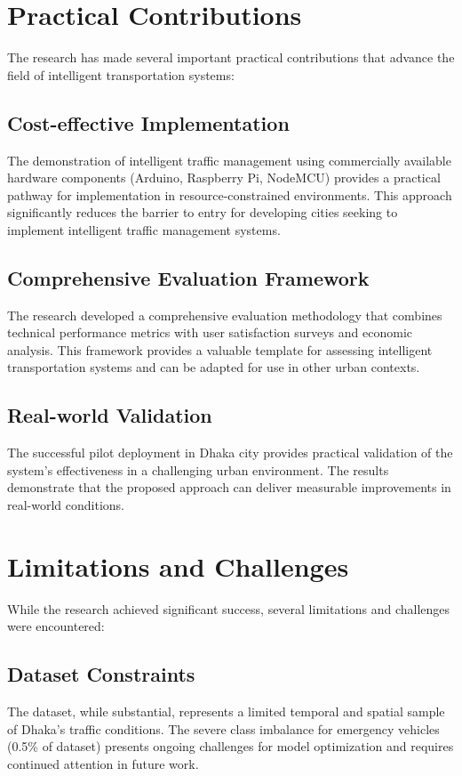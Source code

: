 \section{Practical Contributions}
\label{sec:practical_contributions}

The research has made several important practical contributions that advance the field of intelligent transportation systems:

\subsection{Cost-effective Implementation}
The demonstration of intelligent traffic management using commercially available hardware components (Arduino, Raspberry Pi, NodeMCU) provides a practical pathway for implementation in resource-constrained environments. This approach significantly reduces the barrier to entry for developing cities seeking to implement intelligent traffic management systems.

\subsection{Comprehensive Evaluation Framework}
The research developed a comprehensive evaluation methodology that combines technical performance metrics with user satisfaction surveys and economic analysis. This framework provides a valuable template for assessing intelligent transportation systems and can be adapted for use in other urban contexts.

\subsection{Real-world Validation}
The successful pilot deployment in Dhaka city provides practical validation of the system's effectiveness in a challenging urban environment. The results demonstrate that the proposed approach can deliver measurable improvements in real-world conditions.

\section{Limitations and Challenges}
\label{sec:limitations_summary}

While the research achieved significant success, several limitations and challenges were encountered:

\subsection{Dataset Constraints}
The dataset, while substantial, represents a limited temporal and spatial sample of Dhaka's traffic conditions. The severe class imbalance for emergency vehicles (0.5\% of dataset) presents ongoing challenges for model optimization and requires continued attention in future work.

